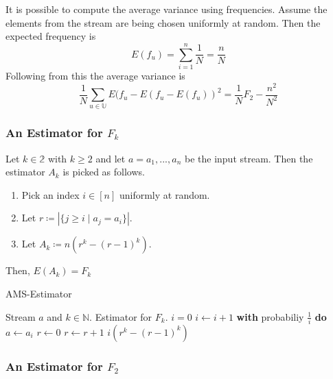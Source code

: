 \documentclass[english]{panikzettel}
\begin{document}
It is possible to compute the average variance using frequencies. Assume the elements from the stream are being chosen uniformly at random. Then the expected frequency is
\[
E(f_u)=\sum_{i=1}^n\frac{1}{N}=\frac{n}{N}
\]
Following from this the average variance is
\[
\frac{1}{N}\sum_{u\in\mathbb{U}}E(f_u-E(f_u-E(f_u))^2 = \frac{1}{N}F_2-\frac{n^2}{N^2}
\]

\subsubsection{An Estimator for $F_k$}
\begin{halfboxl}
\vspace{-\baselineskip}

	Let $k\in\mathbb{2}$ with $k\geq 2$ and let $a=a_1,...,a_n$ be the input stream.
	Then the estimator $A_k$ is picked as follows.
	\begin{enumerate}
	\item Pick an index $i\in [n]$ uniformly at random.
	\item Let $r\coloneqq |\{j\geq i \mid a_j=a_i \}|$.
	\item Let $A_k\coloneqq n(r^k-(r-1)^k)$.
	\end{enumerate}
	Then, $E(A_k)=F_k$

\end{halfboxl}
\begin{halfboxr}
\vspace{-\baselineskip}

\begin{algo}{AMS-Estimator}
	{
	\renewcommand{\algorithmicrequire}{\textbf{Input:}}
	\renewcommand{\algorithmicensure}{\textbf{Output:}}
	  \begin{algorithmic}[1]
	  \Require Stream $a$ and $k\in\mathbb{N}$.
 	    \Ensure Estimator for $F_k$.
	  \State $i=0$
	    \State $i\leftarrow i+1$
	    \State \textbf{with} probabiliy $\frac{1}{i}$ \textbf{do}
	    \State\hspace{\algorithmicindent} $a\leftarrow a_i$
	    \State\hspace{\algorithmicindent} $r\leftarrow 0$
	      \State $r\leftarrow r+1$
	    \EndIf
	  \EndWhile
	  \State \Return $i(r^k-(r-1)^k)$
	  \end{algorithmic}
	}
	\end{algo}

\end{halfboxr}

\subsubsection{An Estimator for $F_2$}
\end{document}
